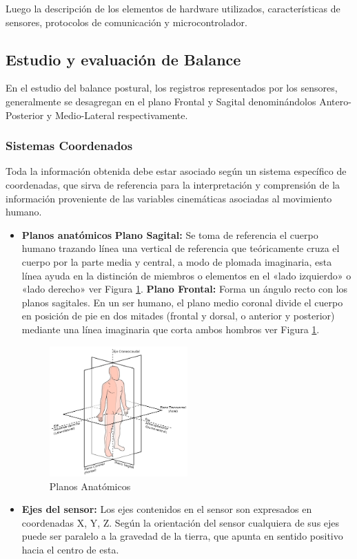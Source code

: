 \documentclass[12pt,a4paper]{article}
\begin{document}
Luego la descripción de los elementos de hardware utilizados, características de sensores, protocolos de comunicación y microcontrolador.


\subsection{Estudio y evaluación de Balance}

En el estudio del balance postural, los registros representados por los sensores, generalmente se desagregan en el plano Frontal y Sagital denominándolos Antero-Posterior y Medio-Lateral respectivamente. 

\subsubsection{Sistemas Coordenados}

Toda la información obtenida debe estar asociado según un sistema específico de coordenadas, que sirva de referencia para la interpretación y comprensión de la información proveniente de las variables cinemáticas asociadas al movimiento humano.

\begin{itemize}
	
	\item \textbf{Planos anatómicos} 
	\subitem \textbf{Plano Sagital:}
	Se toma de referencia el cuerpo humano trazando línea una  vertical de referencia que teóricamente cruza el cuerpo por la parte media y central, a modo de plomada imaginaria, esta línea ayuda en la distinción de miembros o elementos en el «lado izquierdo» o «lado derecho» ver Figura \ref{fig:sagital}.
	\subitem \textbf{Plano Frontal:} Forma un ángulo recto con los planos sagitales. En un ser humano, el plano medio coronal divide el cuerpo en posición de pie en dos mitades (frontal y dorsal, o anterior y posterior) mediante una línea imaginaria que corta ambos hombros ver Figura \ref{fig:sagital}.
	
	\begin{figure}[H]
		\centering
		\includegraphics[width=0.5\textwidth]{images/planosAnatomicos}
		\caption{Planos Anatómicos}
		\label{fig:sagital}
	\end{figure}
	
	\item \textbf{Ejes del sensor:} Los ejes contenidos en el sensor son expresados en coordenadas X, Y, Z.
	Según la orientación del sensor cualquiera de sus ejes puede ser paralelo a la gravedad de la tierra, que apunta en sentido positivo hacia el centro de esta.
\end{itemize}
\end{document}
